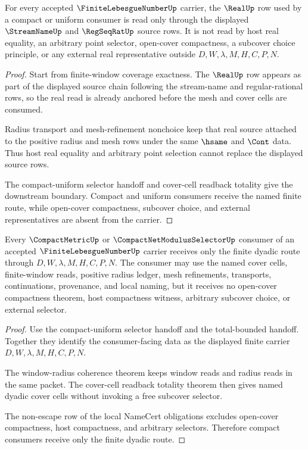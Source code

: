 \begin{theorem}
\label{thm:finite-lebesgue-number-real-source-nonchoice}
For every accepted $\FiniteLebesgueNumberUp$ carrier, the $\RealUp$ row used by a compact or uniform consumer is read only through the displayed $\StreamNameUp$ and $\RegSeqRatUp$ source rows. It is not read by host real equality, an arbitrary point selector, open-cover compactness, a subcover choice principle, or any external real representative outside $D,W,\lambda,M,H,C,P,N$.
\end{theorem}
\begin{proof}
Start from finite-window coverage exactness. The $\RealUp$ row appears as part of the displayed source chain following the stream-name and regular-rational rows, so the real read is already anchored before the mesh and cover cells are consumed.

Radius transport and mesh-refinement nonchoice keep that real source attached to the positive radius and mesh rows under the same $\hsame$ and $\Cont$ data. Thus host real equality and arbitrary point selection cannot replace the displayed source rows.

The compact-uniform selector handoff and cover-cell readback totality give the downstream boundary. Compact and uniform consumers receive the named finite route, while open-cover compactness, subcover choice, and external representatives are absent from the carrier.
\end{proof}

\begin{theorem}
\label{thm:finite-lebesgue-number-compact-consumer-nonchoice-boundary}
Every $\CompactMetricUp$ or $\CompactNetModulusSelectorUp$ consumer of an accepted $\FiniteLebesgueNumberUp$ carrier receives only the finite dyadic route through $D,W,\lambda,M,H,C,P,N$. The consumer may use the named cover cells, finite-window reads, positive radius ledger, mesh refinements, transports, continuations, provenance, and local naming, but it receives no open-cover compactness theorem, host compactness witness, arbitrary subcover choice, or external selector.
\end{theorem}
\begin{proof}
Use the compact-uniform selector handoff and the total-bounded handoff. Together they identify the consumer-facing data as the displayed finite carrier $D,W,\lambda,M,H,C,P,N$.

The window-radius coherence theorem keeps window reads and radius reads in the same packet. The cover-cell readback totality theorem then gives named dyadic cover cells without invoking a free subcover selector.

The non-escape row of the local NameCert obligations excludes open-cover compactness, host compactness, and arbitrary selectors. Therefore compact consumers receive only the finite dyadic route.
\end{proof}


